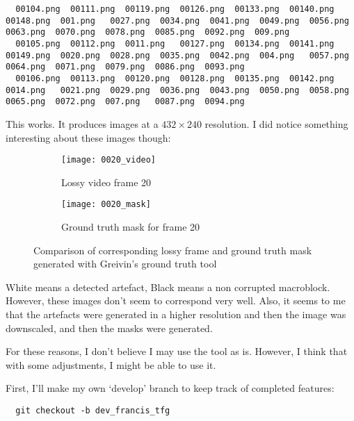 \documentclass[12pt,oneside]{book}
\begin{document}
\begin{lstlisting}
  00104.png  00111.png  00119.png  00126.png  00133.png  00140.png  00148.png  001.png   0027.png  0034.png  0041.png  0049.png  0056.png  0063.png  0070.png  0078.png  0085.png  0092.png  009.png
  00105.png  00112.png  0011.png   00127.png  00134.png  00141.png  00149.png  0020.png  0028.png  0035.png  0042.png  004.png   0057.png  0064.png  0071.png  0079.png  0086.png  0093.png
  00106.png  00113.png  00120.png  00128.png  00135.png  00142.png  0014.png   0021.png  0029.png  0036.png  0043.png  0050.png  0058.png  0065.png  0072.png  007.png   0087.png  0094.png\end{lstlisting}

This works. It produces images at a $432\times240$ resolution. I did notice something interesting about these images though:

  \begin{figure} [!h]
    \centering
    
    \begin{subfigure}[t]{0.49\textwidth}
      \centering
      \texttt{[image: 0020\_video]}
      \caption{Lossy video frame 20}
      \label{fig:1.1.a}
    \end{subfigure}
    \hfill
    \begin{subfigure}[t]{0.49\textwidth}
      \centering
      \texttt{[image: 0020\_mask]}
      \caption{Ground truth mask for frame 20}
      \label{fig:1.1.b}
    \end{subfigure}
    
    \caption{Comparison of corresponding lossy frame and ground truth mask generated with Greivin's ground truth tool}
    \label{fig:1.1}
  
  \end{figure}

White means a detected artefact, Black means a non corrupted macroblock.
However, these images don't seem to correspond very well. Also, it seems to me that the artefacts were generated in a higher resolution and then the image was downscaled, and then the masks were generated.

For these reasons, I don't believe I may use the tool as is.
However, I think that with some adjustments, I might be able to use it.

First, I'll make my own `develop' branch to keep track of completed features:
\begin{lstlisting}
  git checkout -b dev_francis_tfg\end{lstlisting}
\end{document}
